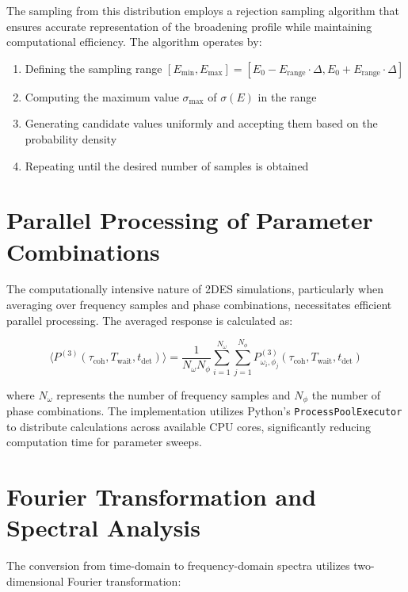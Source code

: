 \noindent
The sampling from this distribution employs a rejection sampling algorithm that ensures accurate representation of the broadening profile while maintaining computational efficiency. The algorithm operates by:

\begin{enumerate}
    \item Defining the sampling range $[E_{\text{min}}, E_{\text{max}}] = [E_0 - E_{\text{range}} \cdot \Delta, E_0 + E_{\text{range}} \cdot \Delta]$
    \item Computing the maximum value $\sigma_{\text{max}}$ of $\sigma(E)$ in the range
    \item Generating candidate values uniformly and accepting them based on the probability density
    \item Repeating until the desired number of samples is obtained
\end{enumerate}

\section{Parallel Processing of Parameter Combinations}
\label{sec:parallel_processing}

\noindent
The computationally intensive nature of 2DES simulations, particularly when averaging over frequency samples and phase combinations, necessitates efficient parallel processing. The averaged response is calculated as:

\begin{equation}
    \label{eq:averaged_response}
    \langle P^{(3)}(\tau_{\text{coh}}, T_{\text{wait}}, t_{\text{det}}) \rangle = \frac{1}{N_\omega N_\phi} \sum_{i=1}^{N_\omega} \sum_{j=1}^{N_\phi} P^{(3)}_{\omega_i, \phi_j}(\tau_{\text{coh}}, T_{\text{wait}}, t_{\text{det}})
\end{equation}

\noindent
where $N_\omega$ represents the number of frequency samples and $N_\phi$ the number of phase combinations. The implementation utilizes Python's \texttt{ProcessPoolExecutor} to distribute calculations across available CPU cores, significantly reducing computation time for parameter sweeps.

\section{Fourier Transformation and Spectral Analysis}
\label{sec:fourier_transformation}

The conversion from time-domain to frequency-domain spectra utilizes two-dimensional Fourier transformation:

